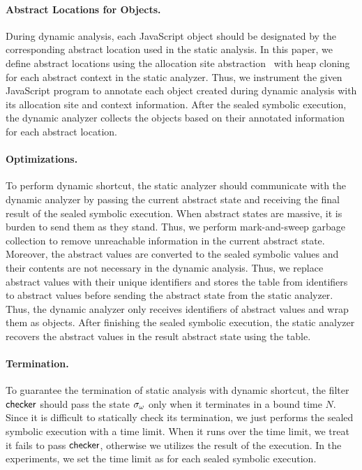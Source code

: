 \paragraph{Abstract Locations for Objects.}
During dynamic analysis, each JavaScript object should be designated by the
corresponding abstract location used in the static analysis.  In this paper, we
define abstract locations using the allocation site
abstraction~\cite{allocation-site} with heap cloning~\cite{heap-cloning} for
each abstract context in the static analyzer.  Thus, we instrument the given
JavaScript program to annotate each object created during dynamic analysis with
its allocation site and context information.  After the sealed symbolic
execution, the dynamic analyzer collects the objects based on their annotated
information for each abstract location.


\paragraph{Optimizations.}
To perform dynamic shortcut, the static analyzer should communicate with the
dynamic analyzer by passing the current abstract state and receiving the final
result of the sealed symbolic execution.  When abstract states are massive, it
is burden to send them as they stand.  Thus, we perform mark-and-sweep garbage
collection to remove unreachable information in the current abstract state.
Moreover, the abstract values are converted to the sealed symbolic values and
their contents are not necessary in the dynamic analysis.  Thus, we replace
abstract values with their unique identifiers and stores the table from
identifiers to abstract values before sending the abstract state
from the static analyzer.  Thus, the dynamic analyzer only receives identifiers
of abstract values and wrap them as  objects.  After finishing the
sealed symbolic execution, the static analyzer recovers the abstract values in
the result abstract state using the table.


\paragraph{Termination.}
To guarantee the termination of static analysis with dynamic shortcut, the
filter $\textsf{checker}$ should pass the state ${\sigma}_\omega$ only when it terminates in a
bound time $N$.  Since it is difficult to statically check its termination,
we just performs the sealed symbolic execution with a time limit.  When it runs
over the time limit, we treat it fails to pass $\textsf{checker}$, otherwise we utilizes
the result of the execution.  In the experiments, we set the time limit as
 for each sealed symbolic execution.


